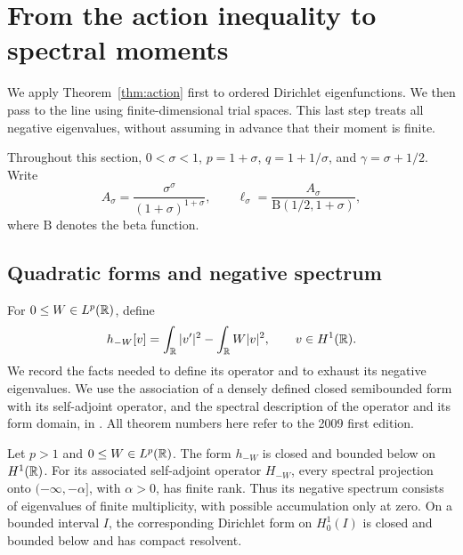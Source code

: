 \section{From the action inequality to spectral moments}
\label{sec:spectral}

We apply Theorem~\ref{thm:action} first to ordered Dirichlet
eigenfunctions.  We then pass to the line using finite-dimensional trial
spaces.  This last step treats all negative eigenvalues, without assuming
in advance that their moment is finite.

Throughout this section, $0<\sigma<1$, $p=1+\sigma$,
$q=1+1/\sigma$, and $\gamma=\sigma+1/2$.  Write
\begin{equation}\label{spectral:constant}
 A_\sigma=\frac{\sigma^\sigma}{(1+\sigma)^{1+\sigma}},
 \qquad
 \ell_\sigma=\frac{A_\sigma}{\mathrm B(1/2,1+\sigma)},
\end{equation}
where $\mathrm B$ denotes the beta function.

\subsection{Quadratic forms and negative spectrum}

For $0\leq W\in L^p(\mathbb R)$, define
\[
 h_{-W}[v]=\int_\mathbb R |v'|^2-\int_\mathbb R W|v|^2,
 \qquad v\in H^1(\mathbb R).
\]
We record the facts needed to define its operator and to exhaust its
negative eigenvalues. We use the association of a densely defined closed
semibounded form with its self-adjoint operator, and the spectral
description of the operator and its form domain, in
\cite[Theorem~2.13, Theorems~3.7--3.8 and (3.50)--(3.51)]{Teschl2009}.
All theorem numbers here refer to the 2009 first edition.

\newpage
\begin{lemma}\label{spectral:forms}
Let $p>1$ and $0\leq W\in L^p(\mathbb R)$.  The form $h_{-W}$ is closed
and bounded below on $H^1(\mathbb R)$.  For its associated self-adjoint operator
$H_{-W}$, every spectral projection onto $(-\infty,-\alpha]$, with
$\alpha>0$, has finite rank.  Thus its negative spectrum consists of
eigenvalues of finite multiplicity, with possible accumulation only at
zero.  On a bounded interval $I$, the corresponding Dirichlet form on
$H^1_0(I)$ is closed and bounded below and has compact resolvent.
\end{lemma}

